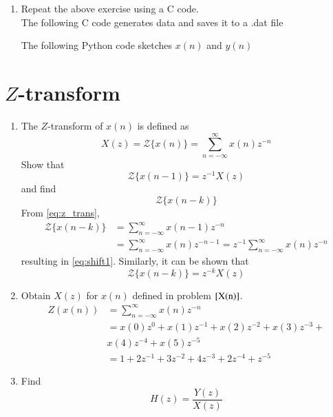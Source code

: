 \begin{enumerate}[label=\thesection.\arabic*,ref=\thesection.\theenumi]
\begin{figure}[!ht]
\begin{center}
\end{center}
\end{figure}
\item Repeat the above exercise using a C code.
\\
\solution
The following C code generates data and saves it to a .dat file

The following Python code sketches $x(n)$ and $y(n)$

\end{enumerate}
\section{$Z$-transform}
\begin{enumerate}[label=\thesection.\arabic*]
\item The $Z$-transform of $x(n)$ is defined as
%
\begin{equation}
\label{eq:z_trans}
X(z)={\mathcal {Z}}\{x(n)\}=\sum _{n=-\infty }^{\infty }x(n)z^{-n}
\end{equation}
%
Show that
\begin{equation}
\label{eq:shift1}
{\mathcal {Z}}\{x(n-1)\} = z^{-1}X(z)
\end{equation}
and find
\begin{equation}
	{\mathcal {Z}}\{x(n-k)\} 
\end{equation}
\solution From \eqref{eq:z_trans},
\begin{align}
{\mathcal {Z}}\{x(n-k)\} &=\sum _{n=-\infty }^{\infty }x(n-1)z^{-n}
\\
&=\sum _{n=-\infty }^{\infty }x(n)z^{-n-1} = z^{-1}\sum _{n=-\infty }^{\infty }x(n)z^{-n}
\end{align}
resulting in \eqref{eq:shift1}. Similarly, it can be shown that
%
\begin{equation}
\label{eq:z_trans_shift}
	{\mathcal {Z}}\{x(n-k)\} = z^{-k}X(z)
\end{equation}
\item Obtain $X(z)$ for $x(n)$ defined in problem  $\eqref{X(n)}$.
\solution
\begin{align}
Z(x(n))&=\sum_{n=-\infty}^{\infty}x(n)z^{-n}\\
&=x(0)z^{0}+x(1)z^{-1}+x(2)z^{-2}+x(3)z^{-3}+\\
&\nonumber x(4)z^{-4}+x(5)z^{-5}\\
&=1+2z^{-1}+3z^{-2}+4z^{-3}+2z^{-4}+z^{-5}
\end{align}
\item Find
%
\begin{equation}
H(z) = \frac{Y(z)}{X(z)}

\end{equation}
\end{enumerate}
